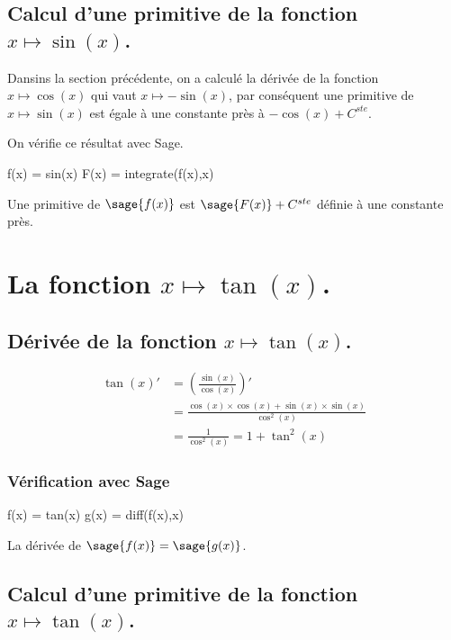 \documentclass[a4paper,12pt]{report}
\begin{document}
\subsection{Calcul d'une primitive de la fonction  $x \mapsto \sin(x)$.}

Dansins la section précédente, on a calculé la dérivée de la fonction $x \mapsto \cos(x)$ qui vaut $x \mapsto -\sin(x)$, par conséquent une primitive de $x \mapsto \sin(x)$ est égale à une constante près à $ - \cos(x) + C^{ste} $.

On vérifie ce résultat avec Sage.

\begin{sageblock}
    f(x) = sin(x)
    F(x) = integrate(f(x),x) 
\end{sageblock}

Une primitive de $\sage{f(x)}$ est $ \sage{F(x)} + C^{ste} $ définie à une constante près.


\section{La fonction  $x \mapsto \tan(x)$.}

\subsection{Dérivée de la fonction $x \mapsto \tan(x)$.}


\begin{align*}
\tan(x)' & =  \left(\frac{\sin(x)}{\cos(x)}\right)' \\ & =  \frac{\cos(x) \times \cos(x)+\sin(x)\times \sin(x)}{\cos^2(x)}  \\ & =  \frac{1}{\cos^2(x)} = 1 + \tan^2(x)
\end{align*}

\subsubsection{Vérification avec Sage}

\begin{sageblock}
    f(x) = tan(x)
    g(x) = diff(f(x),x) 
\end{sageblock}

La dérivée de $\sage{f(x)} = \sage{g(x)} $.


\subsection{Calcul d'une primitive de la fonction  $x \mapsto \tan(x)$.}
\end{document}
